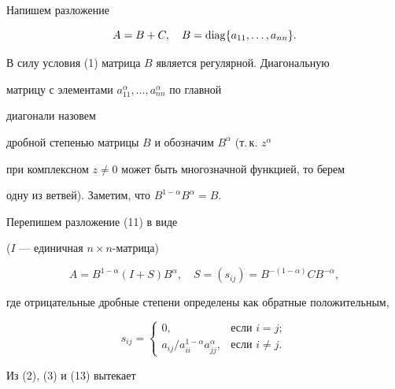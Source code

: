  


\begin{pf} 


Напишем разложение 


\begin{equation} 


A=B+C,\quad B=\diag\{a_{11},\dotsc,a_{nn}\}. 


\end{equation} 


В силу условия (1) матрица $B$ является регулярной. Диагональную  


матрицу с элементами $a^\alpha_{11},\dotsc,a^\alpha_{nn}$ по главной 


диагонали назовем 


дробной степенью матрицы $B$ и обозначим $B^\alpha$ (т.\,к. $z^\alpha$ 


при комплексном $z\ne 0$ может быть многозначной функцией, то берем 


одну из ветвей). Заметим, что $B^{1-\alpha}B^\alpha=B$.


 


Перепишем разложение (11) в виде 


($I$ --- единичная $n\times n$-матрица)


\begin{equation} 


A=B^{1-\alpha}(I+S)B^\alpha,\quad 


S=(s_{ij})=B^{-(1-\alpha)}C B^{-\alpha}, 


\end{equation} 


где отрицательные дробные степени определены как обратные положительным, 


\begin{equation} 


s_{ij}= 


\begin{cases} 


0, &\text{если }i=j;\\ 


a_{ij}/a^{1-\alpha}_{ii}a^\alpha_{jj}, &\text{если }i\ne j. 


\end{cases} 


\end{equation} 


Из (2), (3) и (13) вытекает 


\begin{equation} 



\end{equation}
\end{pf}
